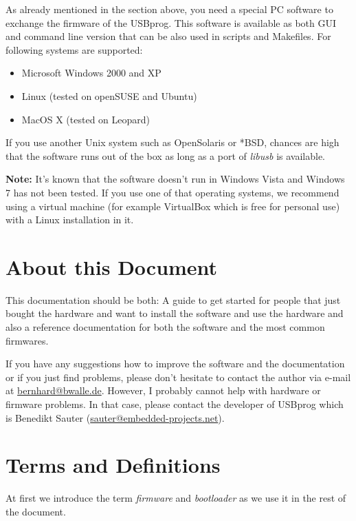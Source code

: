 \documentclass[bibtotoc,UKenglish,halfparskip,oneside,DIV12]{scrreprt}
\begin{document}
As already mentioned in the section above, you need a special PC software to exchange the firmware
of the USBprog. This software is available as both GUI and command line version that can be also
used in scripts and Makefiles. For following systems are supported:

\begin{itemize}
  \item Microsoft Windows 2000 and XP
  \item Linux (tested on openSUSE and Ubuntu)
  \item MacOS X (tested on Leopard)
\end{itemize}

If you use another Unix system such as OpenSolaris or *BSD, chances are high that the software runs
out of the box as long as a port of \emph{libusb} is available.

\textbf{Note:} It's known that the software doesn't run in Windows Vista and Windows 7 has not been
tested. If you use one of that operating systems, we recommend using a virtual machine (for example
VirtualBox which is free for personal use) with a Linux installation in it.

\section{About this Document}

This documentation should be both: A guide to get started for people that just bought the hardware
and want to install the software and use the hardware and also a reference documentation for both
the software and the most common firmwares.

If you have any suggestions how to improve the software and the documentation or if you just find
problems, please don't hesitate to contact the author via e-mail at \url{bernhard@bwalle.de}.
However, I probably cannot help with hardware or firmware problems. In that case, please contact the
developer of USBprog which is Benedikt Sauter (\url{sauter@embedded-projects.net}).

\section{Terms and Definitions}

At first we introduce the term \emph{firmware} and \emph{bootloader} as we use it in the rest of the
document.
\end{document}
